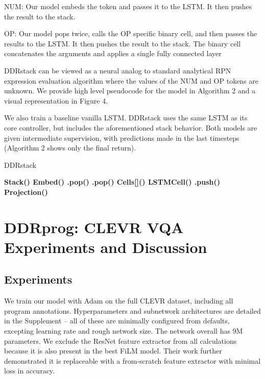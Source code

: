 \documentclass{article}
\begin{document}
NUM: Our model embeds the token and passes it to the LSTM. It then pushes the result to the stack. 

OP: Our model pops twice, calls the OP specific binary cell, and then passes the results to the LSTM. It then pushes the result to the stack. The binary cell concatenates the arguments and applies a single fully connected layer


DDRstack can be viewed as a neural analog to standard analytical RPN expression evaluation algorithm where the values of the NUM and OP tokens are unknown. We provide high level pseudocode for the model in Algorithm 2 and a visual representation in Figure 4. 

We also train a baseline vanilla LSTM. DDRstack uses the same LSTM as its core controller, but includes the aforementioned stack behavior. Both models are given intermediate supervision, with predictions made in the last  timesteps (Algorithm 2 shows only the final return).

\begin{algorithm}[H]
\caption{DDRstack}
\begin{algorithmic}
\INPUT 
\STATE  \bf{Stack}()
\STATE 
{}
    	\STATE  \bf{Embed}()
		\STATE .\bf{pop}()
        \STATE .\bf{pop}()
        \STATE  \bf{Cells}[]()
    \ENDIF
    \STATE  \bf{LSTMCell}()
	\STATE .\bf{push}()
\ENDFOR
\OUTPUT \bf{Projection}()
\end{algorithmic}
\end{algorithm}

\section{DDRprog: CLEVR VQA Experiments and Discussion}

\subsection{Experiments}
We train our model with Adam \cite{DBLP:journals/corr/KingmaB14} on the full CLEVR dataset, including all program annotations. Hyperparameters and subnetwork architectures are detailed in the Supplement -- all of these are minimally configured from defaults, excepting learning rate and rough network size. The network overall has 9M parameters. We exclude the ResNet feature extractor from all calculations because it is also present in the best FiLM model. Their work further demonstrated it is replaceable with a from-scratch feature extractor with minimal loss in accuracy. 
\end{document}

